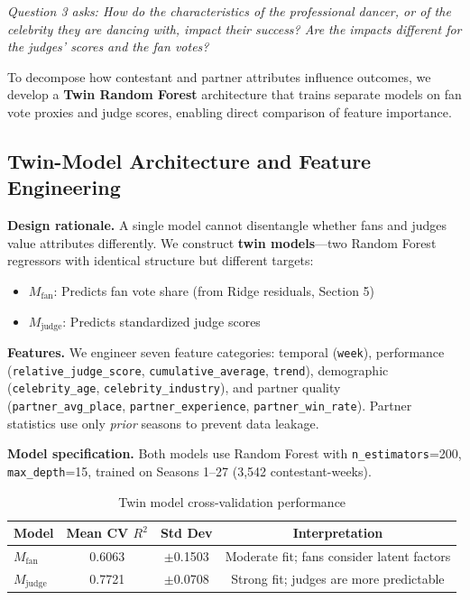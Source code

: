 \documentclass{mcmthesis}
\begin{document}
\textit{Question 3 asks: How do the characteristics of the professional dancer, or of the celebrity they are dancing with, impact their success? Are the impacts different for the judges' scores and the fan votes?}

To decompose how contestant and partner attributes influence outcomes, we develop a \textbf{Twin Random Forest} architecture that trains separate models on fan vote proxies and judge scores, enabling direct comparison of feature importance.

\subsection{Twin-Model Architecture and Feature Engineering}

\textbf{Design rationale.} A single model cannot disentangle whether fans and judges value attributes differently. We construct \textbf{twin models}---two Random Forest regressors with identical structure but different targets:
\begin{itemize}
    \item $M_{\text{fan}}$: Predicts fan vote share (from Ridge residuals, Section 5)
    \item $M_{\text{judge}}$: Predicts standardized judge scores
\end{itemize}

\textbf{Features.} We engineer seven feature categories: temporal (\texttt{week}), performance (\texttt{relative\_judge\_score}, \texttt{cumulative\_average}, \texttt{trend}), demographic (\texttt{celebrity\_age}, \texttt{celebrity\_industry}), and partner quality (\texttt{partner\_avg\_place}, \texttt{partner\_experience}, \texttt{partner\_win\_rate}). Partner statistics use only \textit{prior} seasons to prevent data leakage.

\textbf{Model specification.} Both models use Random Forest with \texttt{n\_estimators}=200, \texttt{max\_depth}=15, trained on Seasons 1--27 (3,542 contestant-weeks).

\begin{table}[h]
\centering
\caption{Twin model cross-validation performance}
\begin{tabular}{l c c c}
\toprule
Model & Mean CV $R^2$ & Std Dev & Interpretation \\
\midrule
$M_{\text{fan}}$ & 0.6063 & $\pm$0.1503 & Moderate fit; fans consider latent factors \\
$M_{\text{judge}}$ & 0.7721 & $\pm$0.0708 & Strong fit; judges are more predictable \\
\bottomrule
\end{tabular}
\end{table}
\end{document}
